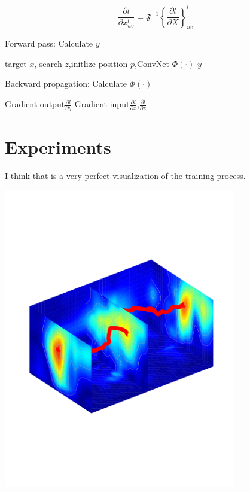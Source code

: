 \documentclass[11pt]{article}
\begin{document}
$$
\frac{\partial l}{\partial x_{uv}^{l}}
=\mathfrak{F}^{-1} \left\{ \frac{\partial l}{\partial X}\right\}_{uv}^l
$$


\begin{algorithm}
\caption{Forward pass: Calculate $y$}
\begin{algorithmic} 
\REQUIRE target $x$, search $z$,initlize position $p$,ConvNet $\Phi(\cdot)$
\RETURN $y$

 \ENDFOR
\end{algorithmic}
\end{algorithm}



\begin{algorithm}
\caption{Backward propagation: Calculate $\Phi(\cdot)$}
\begin{algorithmic} 
\REQUIRE Gradient output$\frac{\partial l}{\partial y}$
\RETURN Gradient input$\frac{\partial l}{\partial x}$,$\frac{\partial l}{\partial z}$

\end{algorithmic}
\end{algorithm}




\section{Experiments}

I think that is a very perfect visualization of the training process.

\begin{center}
\includegraphics[width=4in,trim = 0mm 65mm 0mm 65mm, clip]{./img/visual_training.pdf}
\end{center}
\end{document}
